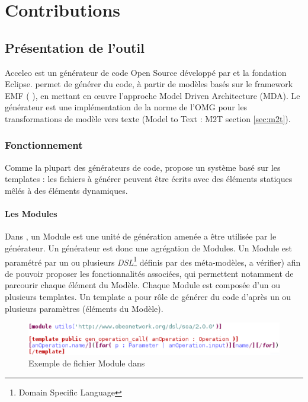 \chapter{Contributions}\label{chap:tra}

\section{Présentation de l'outil \kwacceleo{}}\label{sec:acc}

Acceleo est un générateur de code Open Source développé par \kwobeo{} et la fondation Eclipse. \kwacceleo{} permet de générer du code, à partir de modèles basés sur le framework EMF (\cf{} \cite{emf}), en mettant en œuvre l'approche Model Driven Architecture (MDA). Le générateur \kwacceleo{} est une implémentation de la norme de l'OMG pour les transformations de modèle vers texte (Model to Text : M2T \cf{} section \ref{sec:m2t}).

\subsection{Fonctionnement}

Comme la plupart des générateurs de code, \kwacceleo{} propose un système basé sur les templates : les fichiers à générer peuvent être écrits avec des éléments statiques mêlés à des éléments dynamiques.

\subsubsection{Les Modules}

Dans \kwacceleo{}, un Module est une unité de génération amenée a être utilisée par le générateur. Un générateur est donc une agrégation de Modules. Un Module est paramétré par un ou plusieurs \textit{DSL}\footnote{Domain Specific Language} définis par des méta-modèles, a vérifier) afin de pouvoir proposer les fonctionnalités associées, qui permettent notamment de parcourir chaque élément du Modèle. Chaque Module est composée d'un ou plusieurs templates. Un template a pour rôle de générer du code d'après un ou plusieurs paramètres (éléments du Modèle).

\begin{figure}[htb]
  \centering
  \includegraphics[scale=0.6]{img/screen_template.eps}
  \caption{Exemple de fichier Module dans \kwacceleo{}}
  \label{fig:acc_module}
\end{figure}


